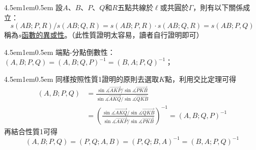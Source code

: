 \documentclass[12pt]{article}
\begin{document}
\begin{mybox}[性質2]{4.5em}{1em}{0.5em}
    設$A$、$B$、$P$、$Q$和$R$五點共線於$\ell$或共圓於$\Gamma$，則有以下關係成立：
    $$
        s\left(AB;P,R\right)/s\left(AB;Q,R\right)=s\left(AB;P,R\right)\cdot s\left(AB;Q,R\right)=s\left(AB;P,Q\right)
    $$
    稱為\underline{$s$函數的異或性}。（此性質證明太容易，讀者自行證明即可）
\end{mybox}
\begin{mybox}[性質3]{4.5em}{1em}{0.5em}
    端點-分點倒數性：$\left(A,B;P,Q\right)=\left(A,B;Q,P\right)^{-1}=\left(B,A;P,Q\right)^{-1}$；
\end{mybox}
\begin{mybox}{4.5em}{1em}{0.5em}
    同樣按照性質1證明的原則去選取$K$點，利用交比定理可得
    \begin{align*}
        \left(A,B;P,Q\right)&=\frac{\sin{\measuredangle{\overrightarrow{AKP}}}/\sin{\measuredangle{\overrightarrow{PKB}}}}{\sin{\measuredangle{\overrightarrow{AKQ}}}/\sin{\measuredangle{\overrightarrow{QKB}}}}\\
        &=\left(\frac{\sin{\measuredangle{\overrightarrow{AKQ}}}/\sin{\measuredangle{\overrightarrow{QKB}}}}{\sin{\measuredangle{\overrightarrow{AKP}}}/\sin{\measuredangle{\overrightarrow{PKB}}}}\right)^{-1}=\left(A,B;Q,P\right)^{-1}
    \end{align*}
    再結合性質1可得
    $$
        \left(A,B;P,Q\right)=\left(P,Q;A,B\right)=\left(P,Q;B,A\right)^{-1}=\left(B,A;P,Q\right)^{-1}
    $$
\end{mybox}
\end{document}
